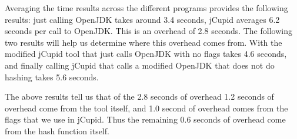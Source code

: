 Averaging the time results across the different programs provides the following
results: just calling OpenJDK takes around 3.4 seconds, jCupid averages 6.2 seconds
per call to OpenJDK. This is an overhead of 2.8 seconds. The following two results
will help us determine where this overhead comes from. With the modified jCupid tool
that just calls OpenJDK with no flags takes 4.6 seconds, and finally calling jCupid
that calls a modified OpenJDK that does not do hashing takes 5.6 seconds.

The above results tell us that of the 2.8 seconds of overhead 1.2 seconds of overhead
come from the tool itself, and 1.0 second of overhead comes from the flags that
we use in jCupid. Thus the remaining 0.6 seconds of overhead come from the hash
function itself.
